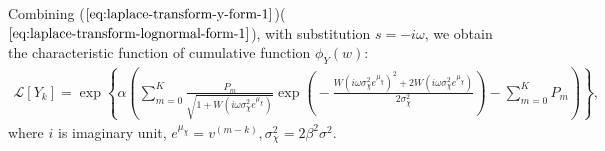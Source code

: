 Combining ($\ref{eq:laplace-transform-y-form-1}$)($\ref{eq:laplace-transform-lognormal-form-1}$), with substitution $s = -i\omega$,  we obtain the characteristic function of cumulative function $\phi_Y\left(w\right)$:
\begin{align}
	\mathcal{L}\left[ Y_k\right] \!= \! \exp \!\! \left\lbrace \!\!\! \alpha \!\! \left( \!\!\!\sum_{m=0}^{K} \!\frac{P_m}{\sqrt{1 + W\!(i \omega \sigma_{\chi}^2 e^{\mu_{\chi}})}} \exp( \!-\frac{W\!\!\left( i \omega\sigma_{\chi}^2 e^{\mu_{\chi}}\right)^2  + 2W\!\!\left( i \omega \sigma_{\chi}^2e^{\mu_{\chi}}\right)}{2\sigma_{\chi}^2} \!)
	\!- \!\!\!\sum_{m=0}^{K} \!\!P_m \!\! \right) \!\!\!\right\rbrace \nonumber,
\end{align}
where $i$ is imaginary unit, $e^{\mu_{\chi}} = v^{\left(m-k\right)}, \sigma^2_{\chi} = 2\beta^2\sigma^2$.

